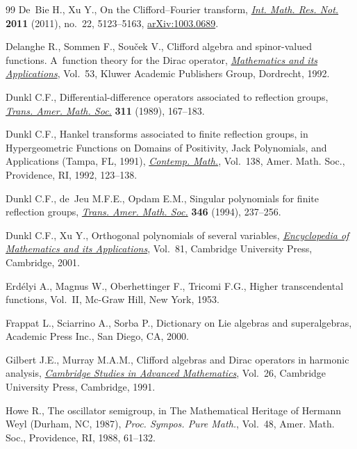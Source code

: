 \documentclass[pdftex]{sigma}
\numberwithin{equation}{section}
\numberwithin{theorem}{section}
\numberwithin{proposition}{section}
\numberwithin{lemma}{section}
\numberwithin{corollary}{section}
\numberwithin{definition}{section}
\numberwithin{example}{section}
\numberwithin{remark}{section}
\numberwithin{note}{section}
\theoremstyle{remark}
\begin{document}
\begin{thebibliography}{99}
De~Bie H., Xu Y., On the {C}lif\/ford--{F}ourier transform,
\href{http://dx.doi.org/10.1093/imrn/rnq288}{\textit{Int.
Math.
Res.
Not.}} \textbf{2011} (2011), no.~22, 5123--5163,
\href{http://arxiv.org/abs/1003.0689}{arXiv:1003.0689}.

Delanghe R., Sommen F., Sou{\v{c}}ek V., Clif\/ford algebra and spinor-valued
functions.
A~function theory for the Dirac operator,
\href{http://dx.doi.org/10.1007/978-94-011-2922-0}{\textit{Mathematics and
its Applications}}, Vol.~53, Kluwer Academic Publishers Group, Dordrecht,
1992.

Dunkl C.F., Dif\/ferential-dif\/ference operators associated to ref\/lection groups,
\href{http://dx.doi.org/10.2307/2001022}{\textit{Trans.
Amer.
Math.
Soc.}} \textbf{311} (1989), 167--183.

Dunkl C.F., Hankel transforms associated to f\/inite ref\/lection groups, in
Hypergeometric Functions on Domains of Positivity, {J}ack Polynomials, and
Applications ({T}ampa, {FL}, 1991),
\href{http://dx.doi.org/10.1090/conm/138/1199124}{\textit{Contemp.
Math.}}, Vol.~138, Amer.
Math.
Soc., Providence, RI, 1992, 123--138.

Dunkl C.F., de~Jeu M.F.E., Opdam E.M., Singular polynomials for f\/inite
ref\/lection groups, \href{http://dx.doi.org/10.2307/2154950}{\textit{Trans.
Amer.
Math.
Soc.}} \textbf{346} (1994),
237--256.

Dunkl C.F., Xu Y., Orthogonal polynomials of several variables,
\href{http://dx.doi.org/10.1017/CBO9780511565717}{\textit{Encyclopedia of Mathematics and its
Applications}}, Vol.~81, Cambridge
University Press, Cambridge, 2001.

Erd\'elyi A., Magnus W., Oberhettinger F., Tricomi F.G., Higher transcendental
functions, Vol.~II, Mc-Graw Hill, New York, 1953.

Frappat L., Sciarrino A., Sorba P., Dictionary on {L}ie algebras and
superalgebras, Academic Press Inc., San Diego, CA, 2000.

Gilbert J.E., Murray M.A.M., Clif\/ford algebras and {D}irac operators in
harmonic analysis, \href{http://dx.doi.org/10.1017/CBO9780511611582}{\textit{Cambridge Studies in
Advanced Mathematics}},
Vol.~26, Cambridge University Press, Cambridge, 1991.

Howe R., The oscillator semigroup, in The Mathematical Heritage of {H}ermann
{W}eyl ({D}urham, {NC}, 1987), \textit{Proc.
Sympos.
Pure Math.}, Vol.~48,
Amer.
Math.
Soc., Providence, RI, 1988, 61--132.


\end{thebibliography}
\end{document}
